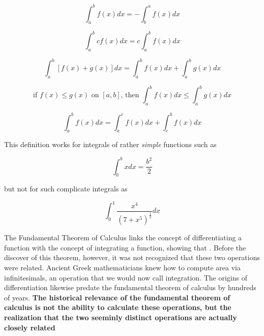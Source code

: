 \begin{equation}\label{eq:definite-integral-reverse}
    \int_a^b f(x)dx = -\int_b^a f(x)dx
\end{equation}

\begin{equation}
    \int_a^b cf(x)dx = c\int_a^b f(x)dx
\end{equation}

\begin{equation}
    \int_a^b [f(x) + g(x)]dx = \int_a^b f(x)dx + \int_a^b g(x)dx
\end{equation}

\begin{equation}
    \text{if } f(x) \le g(x) \text{ on } [a, b] \text{,} \text{\ \ \ \ \ \ then \ \ \ \ \ \ }  \int_a^b f(x)dx \le \int_a^b g(x)dx
\end{equation}

\begin{equation}\label{eq:definite-integral-additive}
    \int_a^b f(x)dx = \int_a^c f(x)dx + \int_c^b f(x)dx
\end{equation}



This definition works for integrals of rather \textit{simple} functions such as

\[
    \int_0^b xdx = \frac{b^2}{2}
\]

but not for such complicate integrals as

\[
    \int_{0}^{1}\frac{x^4}{(7 + x^5)^{\frac{1}{3}}} dx
\]

The Fundamental Theorem of Calculus links the concept of differentiating a function with the concept of integrating a
function, showing that . Before
the discover of this theorem, however, it was not recognized that these two operations were related. Ancient Greek
mathematicians knew how to compute area via infinitesimals, an operation that we would now call integration. The origins
of differentiation likewise predate the fundamental theorem of calculus by hundreds of years. \textbf{The
historical relevance of the fundamental theorem of calculus is not the ability to calculate these operations, but the
realization that the two seeminly distinct operations are actually closely related}

